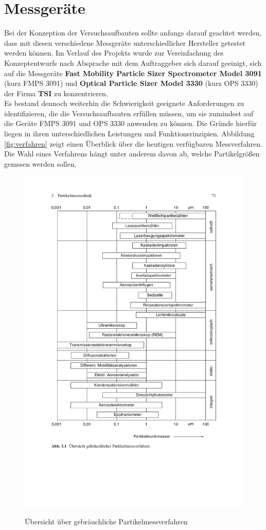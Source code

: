 \section{Messger\"{a}te}
Bei der Konzeption der Versuchsaufbauten sollte anfangs darauf geachtet werden, dass mit diesen verschiedene Messger\"{a}te unterschiedlicher Hersteller getestet werden k\"{o}nnen. Im Verlauf des Projekts wurde zur Vereinfachung des Konzeptentwurfs nach Absprache mit dem Auftraggeber sich darauf geeinigt, sich auf die Messger\"{a}te \textbf{Fast Mobility Particle Sizer Spectrometer Model 3091} (kurz FMPS 3091) und \textbf{Optical Particle Sizer Model 3330} (kurz OPS 3330) der Firma \textbf{TSI} zu konzentrieren. 
\\
Es bestand dennoch weiterhin die Schwierigkeit geeignete Anforderungen zu identifizieren, die die Versuchsaufbauten erf\"{u}llen m\"{u}ssen, um sie zumindest auf die Ger\"{a}te FMPS 3091 und OPS 3330 anwenden zu k\"{o}nnen. Die Gr\"{u}nde hierf\"{u}r liegen in ihren unterschiedlichen Leistungen und Funktionsrinzipien. Abbildung \ref{fig:verfahren} zeigt einen \"{U}berblick \"{u}ber die heutigen verf\"{u}gbaren Messverfahren. Die Wahl eines Verfahrens h\"{a}ngt unter anderem davon ab, welche Partikelgr\"{o}{\ss}en gemssen werden sollen. 
\begin{figure}[H]
	\myfloatalign
	{\includegraphics[width=.6\linewidth]{gfx/measuring_dev/partikelmessverfahren.pdf}} \quad
	\caption[\"{U}bersicht \"{u}ber gebr\"{a}uchliche Partikelmessverfahren\cite{reinraum}]
	{\"{U}bersicht \"{u}ber gebr\"{a}uchliche Partikelmessverfahren\cite{reinraum}}
\end{figure}
